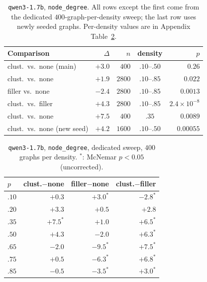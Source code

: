 \documentclass[11pt]{article}
\begin{document}
\begin{table}[H]
\centering
\footnotesize
\setlength{\tabcolsep}{2pt}
\begin{tabular}{lrrcr}
\toprule
Comparison & $\Delta$ & $n$ & density & $p$ \\
\midrule
clust.\ vs.\ none (main)    & $+3.0$ & $400$  & $.10$--$.50$ & $0.26$ \\
clust.\ vs.\ none                & $+1.9$ & $2800$ & $.10$--$.85$ & $0.022$ \\
filler vs.\ none                 & $-2.4$ & $2800$ & $.10$--$.85$ & $0.0013$ \\
clust.\ vs.\ filler              & $+4.3$ & $2800$ & $.10$--$.85$ & $2.4{\times}10^{-8}$ \\
clust.\ vs.\ none                & $+7.5$ & $400$  & $.35$ & $0.0089$ \\
clust.\ vs.\ none (new seed) & $+4.2$ & $1600$ & $.10$--$.50$ & $0.00055$ \\
\bottomrule
\end{tabular}
\caption{\texttt{qwen3-1.7b}, \texttt{node\_degree}. All rows except the
first come from the dedicated $400$-graph-per-density sweep; the last row
uses newly seeded graphs. Per-density values are in Appendix
Table~\ref{tab:headline-density}.}
\label{tab:headline}
\end{table}

\begin{table}[H]
\centering
\footnotesize
\setlength{\tabcolsep}{4pt}
\begin{tabular}{lrrr}
\toprule
$p$ & clust.$-$none & filler$-$none & clust.$-$filler \\
\midrule
$.10$ & $+0.3$ & $+3.0^{*}$ & $-2.8^{*}$ \\
$.20$ & $+3.3$ & $+0.5$ & $+2.8$ \\
$.35$ & $+7.5^{*}$ & $+1.0$ & $+6.5^{*}$ \\
$.50$ & $+4.3$ & $-2.0$ & $+6.3^{*}$ \\
$.65$ & $-2.0$ & $-9.5^{*}$ & $+7.5^{*}$ \\
$.75$ & $+0.5$ & $-6.3^{*}$ & $+6.8^{*}$ \\
$.85$ & $-0.5$ & $-3.5^{*}$ & $+3.0^{*}$ \\
\bottomrule
\end{tabular}
\caption{\texttt{qwen3-1.7b}, \texttt{node\_degree}, dedicated sweep, $400$
graphs per density. $^{*}$: McNemar $p{<}0.05$ (uncorrected).}
\label{tab:headline-density}
\end{table}
\end{document}
